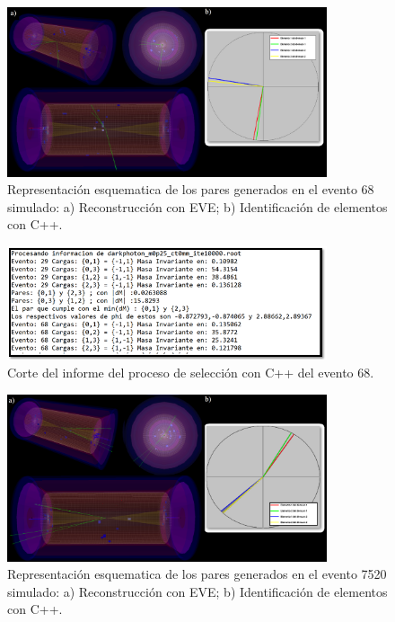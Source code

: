 \begin{figure}[ht!]
    \centering
    \includegraphics[width=0.84\textwidth]{Analisis_y_Resultados/imagenes/evento_68.png}
    \caption{Representación esquematica de los pares generados en el evento 68 simulado: a) Reconstrucción con EVE; b) Identificación de elementos con C++.}
    \label{fig:diagrama_pair}
\end{figure}
\begin{figure}[ht!]
    \centering
    \includegraphics[width=0.84\textwidth]{Analisis_y_Resultados/imagenes/evento_68_info.png}
    \caption{Corte del informe del proceso de selección con C++ del evento 68.}
    \label{fig:diagrama_pair}
\end{figure}
\begin{figure}[ht!]
    \centering
    \includegraphics[width=0.84\textwidth]{Analisis_y_Resultados/imagenes/evento_7520.png}
    \caption{Representación esquematica de los pares generados en el evento 7520 simulado: a) Reconstrucción con EVE; b) Identificación de elementos con C++.}
    \label{fig:diagrama_pair}
\end{figure}

